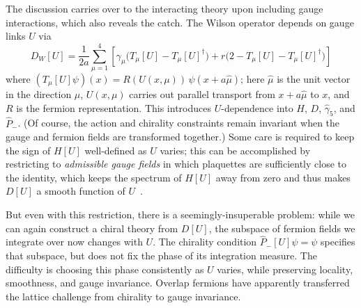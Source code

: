 \documentclass[11pt,a4paper]{article}
\theoremstyle{remark}
\begin{document}
The discussion carries over to the interacting theory upon including gauge interactions, which also reveals the catch. The Wilson operator depends on gauge links $U$ via
\begin{equation}
D_W[U]=\frac{1}{2a}\sum_{\mu=1}^4
\left[
\gamma_\mu\bigl(T_\mu[U]-T_\mu[U]^\dagger\bigr)
+r\bigl(2-T_\mu[U]-T_\mu[U]^\dagger\bigr)
\right]
\end{equation}
where $(T_\mu[U]\psi)(x) = R(U(x,\mu))\,\psi(x+a\hat\mu)$; here $\hat \mu$ is the unit vector in the direction $\mu$, $U(x,\mu)$ carries out parallel transport from $x+a \hat \mu$ to $x$, and $R$ is the fermion representation. This introduces $U$-dependence into $H$, $D$, $\widehat{\gamma}_5$, and $\widehat P_-$. (Of course, the action and chirality constraints remain invariant when the gauge and fermion fields are transformed together.) Some care is required to keep the sign of $H[U]$ well-defined as $U$ varies; this can be accomplished by restricting to {\it admissible gauge fields} in which plaquettes are sufficiently close to the identity, which keeps the spectrum of $H[U]$ away from zero and thus makes $D[U]$ a smooth function of $U$~\cite{HJL}. 

But even with this restriction, there is a seemingly-insuperable problem: while we can again construct a chiral theory from $D[U]$, the subspace of fermion fields we integrate over now changes with $U$. The chirality condition $\widehat{P}_-[U] \psi = \psi$ specifies that subspace, but does not fix the phase of its integration measure. The difficulty is choosing this phase consistently as $U$ varies, while preserving locality, smoothness, and gauge invariance. Overlap fermions have apparently transferred the lattice challenge from chirality to gauge invariance.
\end{document}
